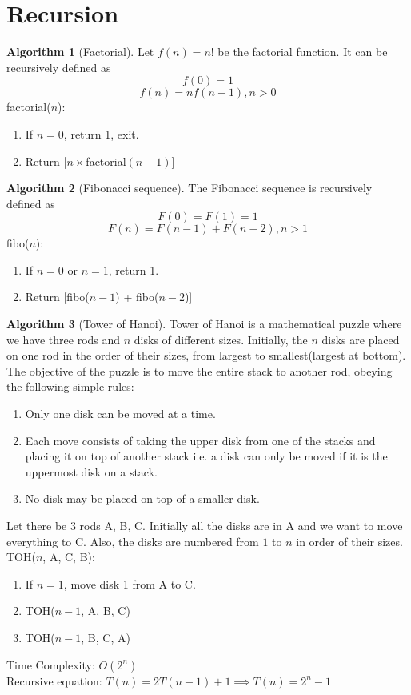 \documentclass[10pt, a4paper]{extarticle}
\theoremstyle{definition}
\newtheorem{alg}{Algorithm}
\begin{document}
	\section{Recursion}
	\begin{alg}[Factorial]
		Let $f(n)=n!$ be the factorial function. It can be recursively defined as
		\[f(0)=1\]\[f(n)=nf(n-1), n>0\]
		factorial($n$):
		\begin{enumerate}
			\item If $n=0$, return 1, exit.
			\item Return $[n\times$factorial$(n-1)]$
	\end{enumerate}
	\end{alg}
	\begin{alg}[Fibonacci sequence]
		The Fibonacci sequence is recursively defined as
		\[F(0)=F(1)=1\]
		\[F(n)=F(n-1)+F(n-2),n>1\]
		fibo($n$):
		\begin{enumerate}
			\item If $n=0$ or $n=1$, return 1.
			\item Return [fibo($n-1$) + fibo($n-2$)]
	\end{enumerate}
	\end{alg}
	\begin{alg}[Tower of Hanoi]
		Tower of Hanoi is a mathematical puzzle where we have three rods and $n$ disks of different sizes. Initially, the $n$ disks are placed on one rod in the order of their sizes, from largest to smallest(largest at bottom). The objective of the puzzle is to move the entire stack to another rod, obeying the following simple rules: 
		\begin{enumerate}
			\item Only one disk can be moved at a time.
			\item Each move consists of taking the upper disk from one of the stacks and placing it on top of another stack i.e. a disk can only be moved if it is the uppermost disk on a stack.
			\item No disk may be placed on top of a smaller disk.
	\end{enumerate}
	Let there be $3$ rods A, B, C. Initially all the disks are in A and we want to move everything to C. Also, the disks are numbered from $1$ to $n$ in order of their sizes.\\
	TOH($n$, A, C, B):
	\begin{enumerate}
		\item If $n=1$, move disk 1 from A to C.
		\item TOH($n-1$, A, B, C)
		\item TOH($n-1$, B, C, A)
\end{enumerate}
	Time Complexity: $O(2^n)$\\
	Recursive equation: $T(n)=2T(n-1)+1\implies T(n)=2^n-1$
	\end{alg}
\end{document}
